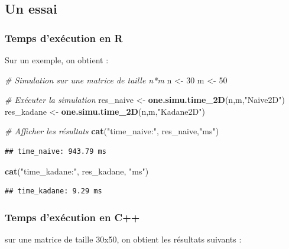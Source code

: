 \documentclass[
]{article}
\newenvironment{Shaded}{\begin{snugshade}}{\end{snugshade}}
\newcommand{\CommentTok}[1]{\textcolor[rgb]{0.56,0.35,0.01}{\textit{#1}}}
\newcommand{\DecValTok}[1]{\textcolor[rgb]{0.00,0.00,0.81}{#1}}
\newcommand{\FunctionTok}[1]{\textcolor[rgb]{0.13,0.29,0.53}{\textbf{#1}}}
\newcommand{\NormalTok}[1]{#1}
\newcommand{\OtherTok}[1]{\textcolor[rgb]{0.56,0.35,0.01}{#1}}
\newcommand{\StringTok}[1]{\textcolor[rgb]{0.31,0.60,0.02}{#1}}
\begin{document}
\subsection{Un essai}\label{un-essai}

\subsubsection{Temps d'exécution en R}\label{temps-dexuxe9cution-en-r}

Sur un exemple, on obtient :

\begin{Shaded}
\begin{Highlighting}[]
\CommentTok{\# Simulation sur une matrice de taille n*m}
\NormalTok{n }\OtherTok{\textless{}{-}} \DecValTok{30}
\NormalTok{m }\OtherTok{\textless{}{-}} \DecValTok{50}

\CommentTok{\# Exécuter la simulation}
\NormalTok{res\_naive }\OtherTok{\textless{}{-}} \FunctionTok{one.simu.time\_2D}\NormalTok{(n,m,}\StringTok{"Naive2D"}\NormalTok{)}
\NormalTok{res\_kadane }\OtherTok{\textless{}{-}} \FunctionTok{one.simu.time\_2D}\NormalTok{(n,m,}\StringTok{"Kadane2D"}\NormalTok{)}

\CommentTok{\# Afficher les résultats}
\FunctionTok{cat}\NormalTok{(}\StringTok{"time\_naive:"}\NormalTok{, res\_naive,}\StringTok{"ms"}\NormalTok{)}
\end{Highlighting}
\end{Shaded}

\begin{verbatim}
## time_naive: 943.79 ms
\end{verbatim}

\begin{Shaded}
\begin{Highlighting}[]
\FunctionTok{cat}\NormalTok{(}\StringTok{"time\_kadane:"}\NormalTok{, res\_kadane, }\StringTok{"ms"}\NormalTok{)}
\end{Highlighting}
\end{Shaded}

\begin{verbatim}
## time_kadane: 9.29 ms
\end{verbatim}

\subsubsection{Temps d'exécution en C++}\label{temps-dexuxe9cution-en-c}

sur une matrice de taille 30x50, on obtient les résultats suivants :
\end{document}
